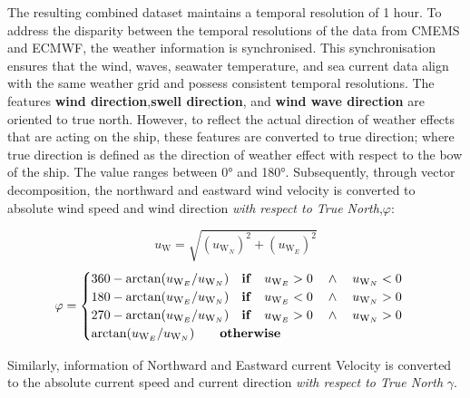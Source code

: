 The resulting combined dataset maintains a temporal resolution of 1 hour. To address the disparity between the temporal resolutions of the data from CMEMS and ECMWF, the weather information is synchronised. This synchronisation ensures that the wind, waves, seawater temperature, and sea current data align with the same weather grid and possess consistent temporal resolutions. The features \textbf{wind direction},\textbf{swell direction}, and \textbf{wind wave direction} are oriented to true north. However, to reflect the actual direction of weather effects that are acting on the ship, these features are converted to true direction; where true direction is defined as the direction of weather effect with respect to the bow of the ship. The value ranges between 0° and 180°. Subsequently, through vector decomposition, the northward and eastward wind velocity is converted to absolute wind speed and wind direction \emph{with respect to True North},$\varphi$:

\begin{equation}\label{eqn:vwindabs}
    u_{\text{W}} = \sqrt{(u_{\text{W}_{N}})^2 + (u_{\text{W}_{E}})^2} 
\end{equation}
\begin{equation}\label{eqn:winddir}
    \varphi = 
    \begin{cases}
        360 - \arctan(u_{\text{W}_{E}} / u_{\text{W}_{N}}) \quad \text{\textbf{if}} \quad u_{\text{W}_{E}} > 0 \quad \wedge \quad u_{\text{W}_{N}} < 0 \\ 
        180 - \arctan(u_{\text{W}_{E}} / u_{\text{W}_{N}}) \quad \text{\textbf{if}} \quad u_{\text{W}_{E}} < 0 \quad \wedge \quad u_{\text{W}_{N}} > 0 \\ 
        270 - \arctan(u_{\text{W}_{E}} / u_{\text{W}_{N}}) \quad \text{\textbf{if}} \quad u_{\text{W}_{E}} > 0 \quad \wedge \quad u_{\text{W}_{N}} > 0 \\
        \arctan(u_{\text{W}_{E}} / u_{\text{W}_{N}}) \qquad \text{\textbf{otherwise}} 
    \end{cases}   
\end{equation}

Similarly, information of Northward and Eastward current Velocity is converted to the absolute current speed and current direction \emph{with respect to True North} $\gamma$.\\ 

